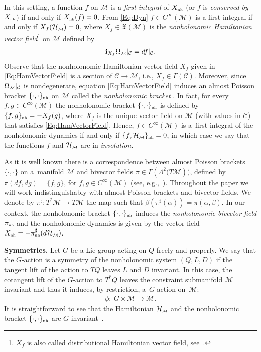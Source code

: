 \documentclass[10pt,a4paper]{amsart}
\numberwithin{equation}{section}
\def\M{\mathcal{M}}
\def\C{\mathcal{C}}
\def\Ham{\mathcal{H}}
\def\nh{{\mbox{\tiny{nh}}}}
\def\subM{{\mbox{\tiny{$\M$}}}}
\begin{document}
In this setting, a function $f$ on $\M$ is a {\it first integral} of $X_\nh$ (or $f$ is {\it conserved by}
$X_\nh$) if and only if $X_\nh(f) = 0$.  From \eqref{Eq:Dyn} $f \in C^\infty(\M)$ is a f\/irst integral
if and only if $X_f(\Ham_\subM)=0$, where $X_f \in \mathfrak{X}(\M)$ is the
{\it nonholonomic Hamiltonian vector field}\footnote{$X_f$
is also called distributional Hamiltonian vector f\/ield, see~\cite{CushmanBook}.} on $\M$ def\/ined by
\begin{gather}\label{Eq:HamVectorField}
{\bf i}_{X_f} \Omega_\subM |_\C = df |_\C  .
\end{gather}
Observe that the nonholonomic Hamiltonian vector f\/ield $X_f$ given in \eqref{Eq:HamVectorField} is a section of $\C\to \M$, i.e., $X_f \in \Gamma(\C)$.
Moreover, since $\Omega_\subM|_\C$ is nondegenerate, equation \eqref{Eq:HamVectorField}  induces an almost Poisson bracket $\{\cdot, \cdot \}_\nh$ on $\M$ called the {\it nonholonomic bracket} \cite{IbLeMaMa1999,Marle1998, SchaftMaschke1994}.  In fact,  for every $f,g \in C^\infty(\M)$ the nonholonomic bracket $\{\cdot, \cdot \}_\nh$ is def\/ined by  $\{f,g\}_\nh = -X_f(g)$, where $X_f$ is the unique vector f\/ield on $\M$ (with values in $\C$) that satisf\/ies \eqref{Eq:HamVectorField}. Hence, $f\in C^\infty(\M)$ is a~f\/irst integral of the nonholonomic dynamics if and only if $\{f,\Ham_\subM\}_\nh = 0$, in which case we say that the functions $f$
and $\Ham_\subM$ are in {\it involution}.

As it is well known there is a correspondence between
almost Poisson brackets $\{\cdot,\cdot\}$ on a~mani\-fold $\M$ and bivector f\/ields
$\pi\in\Gamma\left( \Lambda^2 (T\M\right))$, def\/ined by $\pi(df,dg) = \{f,g\}$,
for $f,g\in C^{\infty}(\M)$  (see, e.g.,~\cite{MarsdenRatiuBook}). Throughout the paper we will work indistinguishably with almost
Poisson brackets and bivector f\/ields. We denote by $\pi^\sharp\colon T^*\M\longrightarrow T\M$ the map
such that $\beta(\pi^\sharp(\alpha)) = \pi(\alpha,\beta)$.
In our context, the nonholonomic bracket $\{\cdot,\cdot\}_\nh$ induces the
{\it nonholonomic bivector field} $\pi_\nh$ and the nonholonomic dynamics is
given by the vector f\/ield $X_\nh = - \pi^\sharp_\nh(d\Ham_\subM)$.

{\bf Symmetries.}
Let $G$ be a Lie group acting on $Q$ freely and properly.  We say that the $G$-action is a symmetry
of the nonholonomic system $(Q,L,D)$ if the tangent lift of the action to $TQ$ leaves
$L$ and $D$ invariant.  In this case, the cotangent lift of the $G$-action to $T^*Q$
leaves the constraint submanifold $\M$ invariant  and thus it induces, by restriction, a~$G$-action on~$\M$:
\begin{gather*}
\phi\colon \ G \times \M \to \M.
\end{gather*}
It is straightforward to see that the Hamiltonian $\Ham_\subM$ and the nonholonomic
bracket $\{\cdot, \cdot \}_\nh$ are $G$-invariant~\cite{IbLeMaMa1999,Marle1998}.
\end{document}
